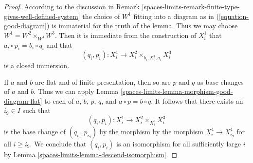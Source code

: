 \begin{proof}
According to the discussion in
Remark \ref{spaces-limits-remark-finite-type-gives-well-defined-system}
the choice of $W^1$ fitting into a diagram as in
(\ref{equation-good-diagram}) is immaterial for the truth of
the lemma. Thus we may choose $W^1 = W^2 \times_{W^4} W^3$.
Then it is immediate from the construction of $X^1_i$ that
$a_i \circ p_i = b_i \circ q_i$ and that
$$
(q_i, p_i) : X^1_i \longrightarrow X^2_i \times_{b_i, X^4_i, a_i} X^3_i
$$
is a closed immersion.

\medskip\noindent
If $a$ and $b$ are flat and of finite presentation, then so are
$p$ and $q$ as base changes of $a$ and $b$. Thus we can apply
Lemma \ref{spaces-limits-lemma-morphism-good-diagram-flat}
to each of $a$, $b$, $p$, $q$, and $a \circ p = b \circ q$.
It follows that there exists an $i_9 \in I$ such that
$$
(q_i, p_i) : X^1_i \to X^2_i \times_{X^4_i} X^3_i
$$
is the base change of $(q_{i_9}, p_{i_9})$ by the morphism
by the morphism $X^4_i \to X^4_{i_9}$ for all $i \geq i_9$.
We conclude that $(q_i, p_i)$ is an isomorphism for all sufficiently
large $i$ by Lemma \ref{spaces-limits-lemma-descend-isomorphism}.
\end{proof}



